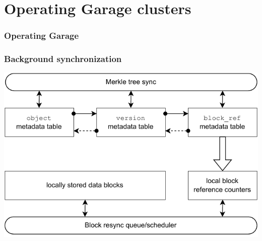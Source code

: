 \documentclass[aspectratio=169,xcolor={svgnames}]{beamer}
\begin{document}

\section{Operating Garage clusters}

\begin{frame}
	\frametitle{Operating Garage}
	\begin{center}
	\end{center}
\end{frame}

\begin{frame}
	\frametitle{Background synchronization}
	\begin{center}
		\includegraphics[width=.6\linewidth]{../assets/garage_sync.drawio.pdf}
	\end{center}
\end{frame}
\end{document}

